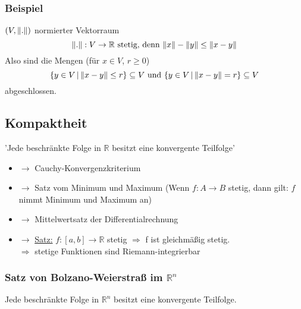 \subsubsection{Beispiel} %
\label{ssub:beispiel}
$(V,\norm{.})$ normierter Vektorraum
\[
	\norm{.}: V \to \mathbb{R} \text{ stetig, denn } \norm{x}-\norm{y} \leq \norm{x-y}
\]
Also sind die Mengen (für $x \in V$, $r \geq 0$)
\[
	\{y \in V \, | \, \norm{x-y}\leq r \} \subseteq V \text{ und } \{y \in V \,|\, \norm{x-y}=r \} \subseteq V
\] abgeschlossen.
\subsection{Kompaktheit} %
\label{sub:kompaktheit}

'Jede beschränkte Folge in $\mathbb{R}$ besitzt eine konvergente Teilfolge'
\begin{itemize}
	\item $\rightarrow $ Cauchy-Konvergenzkriterium
	\item $\rightarrow $ Satz vom Minimum und Maximum (Wenn $f:A \to B$ stetig, dann gilt: $f$ nimmt Minimum und Maximum an)
	\item $\to$ Mittelwertsatz der Differentialrechnung
	\item $\to$ \underline{Satz:} $f:[a,b] \to \mathbb{R}$ stetig $\Rightarrow$ f ist gleichmäßig stetig. \\
		  $\Rightarrow$ stetige Funktionen sind Riemann-integrierbar
\end{itemize}
\subsubsection{Satz von Bolzano-Weierstraß im $\mathbb{R}^n$} %
\label{ssub:satz_von_bolzano_weierstrass_im_mathbb_r_n}
Jede beschränkte Folge in $\mathbb{R}^n$ besitzt eine konvergente Teilfolge.
 
